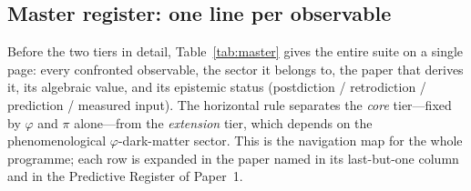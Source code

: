 \documentclass[aps,prd,preprint,amsmath,amssymb,nofootinbib,longbibliography]{revtex4-2}
\begin{document}
\subsection{Master register: one line per observable}
\label{sec:master-register}

Before the two tiers in detail, Table~\ref{tab:master} gives the entire suite
on a single page: every confronted observable, the sector it belongs to, the
paper that derives it, its algebraic value, and its epistemic status
(postdiction / retrodiction / prediction / measured input). The horizontal rule
separates the \emph{core} tier---fixed by $\varphi$ and $\pi$ alone---from the
\emph{extension} tier, which depends on the phenomenological $\varphi$-dark-matter
sector. This is the navigation map for the whole programme; each row is expanded
in the paper named in its last-but-one column and in the Predictive Register of
Paper~1.
\end{document}
